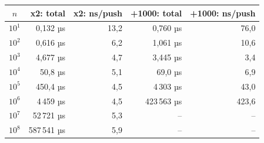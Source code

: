 \begin{tabular}{crrrr}
\toprule
$n$ & \textbf{x2: total} & \textbf{x2: ns/push} & \textbf{+1000: total} & \textbf{+1000: ns/push} \\
\midrule
$10^{1}$ & 0{,}132 µs & 13{,}2 & 0{,}760 µs & 76{,}0 \\
$10^{2}$ & 0{,}616 µs & 6{,}2 & 1{,}061 µs & 10{,}6 \\
$10^{3}$ & 4{,}677 µs & 4{,}7 & 3{,}445 µs & 3{,}4 \\
$10^{4}$ & 50{,}8 µs & 5{,}1 & 69{,}0 µs & 6{,}9 \\
$10^{5}$ & 450{,}4 µs & 4{,}5 & 4\,303 µs & 43{,}0 \\
$10^{6}$ & 4\,459 µs & 4{,}5 & 423\,563 µs & 423{,}6 \\
$10^{7}$ & 52\,721 µs & 5{,}3 & -- & -- \\
$10^{8}$ & 587\,541 µs & 5{,}9 & -- & -- \\
\bottomrule
\end{tabular}